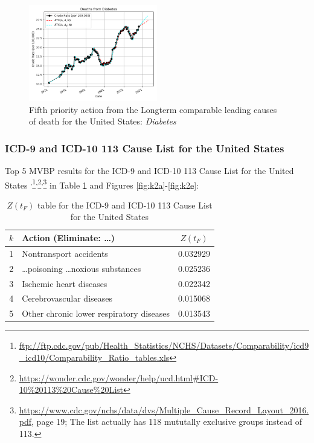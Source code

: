 \documentclass[10pt, a4paper, twocolumn]{IEEEconf}
\newcommand\footnotesstartsep{\textsuperscript{,}}
\newcommand\footnotescontinue{\textsuperscript{,}}
\begin{document}
\begin{figure}[H]
  \centering
  \includegraphics[width=0.5\textwidth]{results/US_ICD_LONGTERM_COMPARABLE_LEADING/Diabetes_ets.png}
  \caption{Fifth priority action from the Longterm comparable leading causes of death for the United States: \textit{Diabetes}}\label{fig:k1e}
\end{figure}

\clearpage

\subsubsection{ICD-9 and ICD-10 113 Cause List for the United States}

Top 5 MVBP results for the ICD-9 and ICD-10 113 Cause List for the United States \citep{nbermortality,anderson2001comparability,centers2017underlying,icdcomparabilityratios}\footnotesstartsep\footnote{\scriptsize{\url{ftp://ftp.cdc.gov/pub/Health_Statistics/NCHS/Datasets/Comparability/icd9_icd10/Comparability_Ratio_tables.xls}}}\footnotescontinue\footnote{\scriptsize{\url{https://wonder.cdc.gov/wonder/help/ucd.html\#ICD-10\%20113\%20Cause\%20List}}}\footnotescontinue\footnote{\scriptsize{\url{https://www.cdc.gov/nchs/data/dvs/Multiple_Cause_Record_Layout_2016.pdf}, page 19; The list actually has 118 mututally exclusive groups instead of 113.}} in Table \ref{table:ztable2} and Figures \ref{fig:k2a}-\ref{fig:k2e}:

\begin{table}[H]
  \centering
  \begin{tabular}{clc}
    \toprule
      $k$ & Action (Eliminate: \ldots) & $Z(t_F)$ \\
    \midrule
      1 &                      Nontransport accidents & 0.032929 \\
      2 &  \ldots poisoning \ldots noxious substances & 0.025236 \\
      3 &                     Ischemic heart diseases & 0.022342 \\
      4 &                    Cerebrovascular diseases & 0.015068 \\
      5 &    Other chronic lower respiratory diseases & 0.013543 \\
  \end{tabular}
  \caption{$Z(t_F)$ table for the ICD-9 and ICD-10 113 Cause List for the United States}
  \label{table:ztable2}
\end{table}
\end{document}
